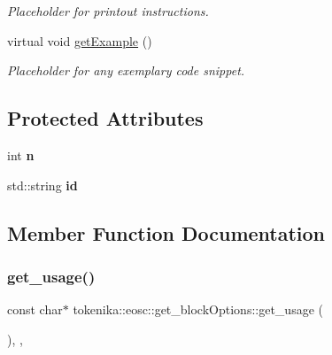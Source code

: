 \begin{DoxyCompactItemize}
\begin{DoxyCompactList}\small\item\em Placeholder for printout instructions. \end{DoxyCompactList}\item 
\mbox{\label{classtokenika_1_1eosc_1_1get__block_options_a26c43df6241d4b177c5b153c70790a70}} 
virtual void \hyperlink{classtokenika_1_1eosc_1_1get__block_options_a26c43df6241d4b177c5b153c70790a70}{get\+Example} ()
\begin{DoxyCompactList}\small\item\em Placeholder for any exemplary code snippet. \end{DoxyCompactList}\end{DoxyCompactItemize}
\subsection*{Protected Attributes}
\begin{DoxyCompactItemize}
\item 
\mbox{\label{classtokenika_1_1eosc_1_1get__block_options_a17a8a689faa135402c721b6c6f602cf5}} 
int {\bfseries n}
\item 
\mbox{\label{classtokenika_1_1eosc_1_1get__block_options_a3614cca54ea91aef023ffaba29afe5d2}} 
std\+::string {\bfseries id}
\end{DoxyCompactItemize}


\subsection{Member Function Documentation}
\mbox{\label{classtokenika_1_1eosc_1_1get__block_options_a339878f62e1d3a3215e0dbf13ba405bf}} 
\subsubsection{\texorpdfstring{get\+\_\+usage()}{get\_usage()}}
{\footnotesize\ttfamily const char$\ast$ tokenika\+::eosc\+::get\+\_\+block\+Options\+::get\+\_\+usage (\begin{DoxyParamCaption}{ }\end{DoxyParamCaption})\hspace{0.3cm}{\ttfamily [inline]}, {\ttfamily [protected]}, {\ttfamily [virtual]}}



